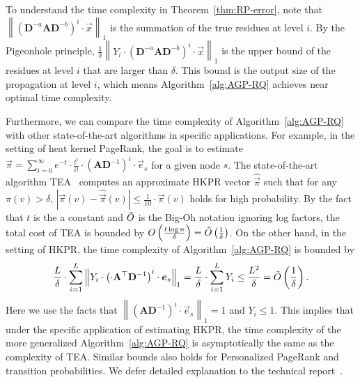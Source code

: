 To understand the time complexity in Theorem~\ref{thm:RP-error}, note that $ \left\| \left(\mathbf{D}^{-a}\mathbf{A}\mathbf{D}^{-b} \right)^i \cdot \vec{x} \right\|_1$ is the summation of the true residues at level $i$.  By the Pigeonhole principle, $ \frac{1}{\delta}\left\| Y_i \cdot \left(\mathbf{D}^{-a}\mathbf{A}\mathbf{D}^{-b} \right)^i \cdot \vec{x} \right\|_1$ is the upper bound of the residues at level $i$ that are larger than $\delta$. This bound is the output size of the propagation at level $i$, which means Algorithm~\ref{alg:AGP-RQ} achieves near optimal time complexity. 



Furthermore, we can compare the time complexity of Algorithm~\ref{alg:AGP-RQ} with other state-of-the-art algorithms in specific applications. For example, in the setting of heat kernel PageRank, the goal is to estimate $\vec{\pi}=\sum_{i=0}^\infty e^{-t} \cdot \frac{t^i}{i!}\cdot \left(\mathbf{A}\mathbf{D}^{-1} \right)^i \cdot \vec{e}_s $ for a given node $s$. The state-of-the-art algorithm TEA~\cite{yang2019TEA} computes an approximate HKPR vector $\hat{\vec{\pi}}$ such that for any $\pi(v)>\delta$, $|\vec{\pi}(v)-\hat{\vec{\pi}}(v)| \leq \frac{1}{10} \cdot \vec{\pi}(v)$ holds for high probability. By the fact that $t$ is the a constant and $\Tilde{O}$ is the Big-Oh notation ignoring log factors, the total cost of TEA is bounded by $O\left(t\log n \over \delta \right) = \Tilde{O}\left(1 \over \delta \right)$. On the other hand, in the setting of HKPR, the time complexity of Algorithm~\ref{alg:AGP-RQ} is bounded by 
\vspace{-2mm}
\begin{equation*}
\vspace{-2mm}
\frac{L}{\delta}\cdot \sum_{i=1}^{L} \left\| Y_i \cdot \left(\cdot \mathbf{A}^\top \mathbf{D}^{-1} \right)^i \cdot \vec{e}_s \right\|_1 = \frac{L}{\delta}\cdot \sum_{i=1}^{L} Y_i \le \frac{L^2}{\delta} = \Tilde{O}\left(1 \over \delta \right).
\end{equation*}
Here we use the facts that $ \left\| \left( \mathbf{A} \mathbf{D}^{-1} \right)^i \cdot \vec{e}_s \right\|_1 =1$ and $Y_i \le 1$. This implies that under the specific application of estimating HKPR, the time complexity of the more generalized  Algorithm~\ref{alg:AGP-RQ} is asymptotically the same as the complexity of TEA. Similar bounds also holds for Personalized PageRank and transition probabilities. We defer detailed explanation to the technical report~\cite{TechnicalReport}. 


